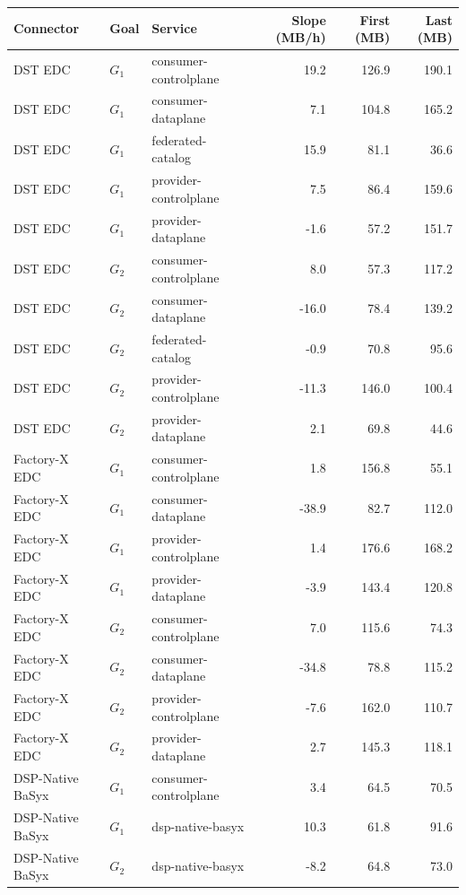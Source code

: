 \begin{tabular}{lllrrr}
    \toprule
    Connector & Goal & Service & Slope (MB/h) & First (MB) & Last (MB) \\
    \midrule
    DST EDC & $G_1$ & consumer-controlplane & 19.2 & 126.9 & 190.1 \\
    DST EDC & $G_1$ & consumer-dataplane & 7.1 & 104.8 & 165.2 \\
    DST EDC & $G_1$ & federated-catalog & 15.9 & 81.1 & 36.6 \\
    DST EDC & $G_1$ & provider-controlplane & 7.5 & 86.4 & 159.6 \\
    DST EDC & $G_1$ & provider-dataplane & -1.6 & 57.2 & 151.7 \\
    DST EDC & $G_2$ & consumer-controlplane & 8.0 & 57.3 & 117.2 \\
    DST EDC & $G_2$ & consumer-dataplane & -16.0 & 78.4 & 139.2 \\
    DST EDC & $G_2$ & federated-catalog & -0.9 & 70.8 & 95.6 \\
    DST EDC & $G_2$ & provider-controlplane & -11.3 & 146.0 & 100.4 \\
    DST EDC & $G_2$ & provider-dataplane & 2.1 & 69.8 & 44.6 \\
    Factory-X EDC & $G_1$ & consumer-controlplane & 1.8 & 156.8 & 55.1 \\
    Factory-X EDC & $G_1$ & consumer-dataplane & -38.9 & 82.7 & 112.0 \\
    Factory-X EDC & $G_1$ & provider-controlplane & 1.4 & 176.6 & 168.2 \\
    Factory-X EDC & $G_1$ & provider-dataplane & -3.9 & 143.4 & 120.8 \\
    Factory-X EDC & $G_2$ & consumer-controlplane & 7.0 & 115.6 & 74.3 \\
    Factory-X EDC & $G_2$ & consumer-dataplane & -34.8 & 78.8 & 115.2 \\
    Factory-X EDC & $G_2$ & provider-controlplane & -7.6 & 162.0 & 110.7 \\
    Factory-X EDC & $G_2$ & provider-dataplane & 2.7 & 145.3 & 118.1 \\
    DSP-Native BaSyx & $G_1$ & consumer-controlplane & 3.4 & 64.5 & 70.5 \\
    DSP-Native BaSyx & $G_1$ & dsp-native-basyx & 10.3 & 61.8 & 91.6 \\
    DSP-Native BaSyx & $G_2$ & dsp-native-basyx & -8.2 & 64.8 & 73.0 \\
    \bottomrule
\end{tabular}
